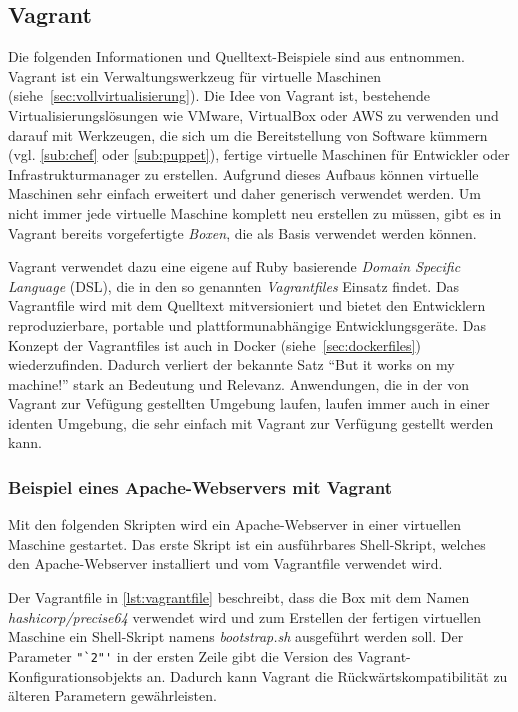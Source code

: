 \subsection{Vagrant}
\label{sub:vagrant}
Die folgenden Informationen und Quelltext-Beispiele sind aus \autocite{Vagrant:online} entnommen.
Vagrant ist ein Verwaltungswerkzeug für virtuelle Maschinen (siehe~\cref{sec:vollvirtualisierung}).
Die Idee von Vagrant ist, bestehende Virtualisierungslösungen wie VMware, VirtualBox oder AWS zu verwenden und darauf mit Werkzeugen, die sich um die Bereitstellung von Software kümmern (vgl. \cref{sub:chef} oder \cref{sub:puppet}), fertige virtuelle Maschinen für Entwickler oder Infrastrukturmanager zu erstellen.
Aufgrund dieses Aufbaus können virtuelle Maschinen sehr einfach erweitert und daher generisch verwendet werden.
Um nicht immer jede virtuelle Maschine komplett neu erstellen zu müssen, gibt es in Vagrant bereits vorgefertigte \emph{Boxen}, die als Basis verwendet werden können.

Vagrant verwendet dazu eine eigene auf Ruby basierende \emph{Domain Specific Language} (DSL), die in den so genannten \emph{Vagrantfiles} Einsatz findet.
Das Vagrantfile wird mit dem Quelltext mitversioniert und bietet den Entwicklern reproduzierbare, portable und plattformunabhängige Entwicklungsgeräte.
Das Konzept der Vagrantfiles ist auch in Docker (siehe~\cref{sec:dockerfiles}) wiederzufinden.
Dadurch verliert der bekannte Satz ``But it works on my machine!'' stark an Bedeutung und Relevanz.
Anwendungen, die in der von Vagrant zur Vefügung gestellten Umgebung laufen, laufen immer auch in einer identen Umgebung, die sehr einfach mit Vagrant zur Verfügung gestellt werden kann.

\subsubsection{Beispiel eines Apache-Webservers mit Vagrant}
Mit den folgenden Skripten wird ein Apache-Webserver in einer virtuellen Maschine gestartet.
Das erste Skript ist ein ausführbares Shell-Skript, welches den Apache-Webserver installiert und vom Vagrantfile verwendet wird.

\label{lst:vagrant-bootstrap}
Der Vagrantfile in \cref{lst:vagrantfile} beschreibt, dass die Box mit dem Namen \emph{hashicorp/precise64} verwendet wird und zum Erstellen der fertigen virtuellen Maschine ein Shell-Skript namens \emph{bootstrap.sh} ausgeführt werden soll.
Der Parameter \lstinline{"`2"'} in der ersten Zeile gibt die Version des Vagrant-Konfigurationsobjekts an.
Dadurch kann Vagrant die Rückwärtskompatibilität zu älteren Parametern gewährleisten.


